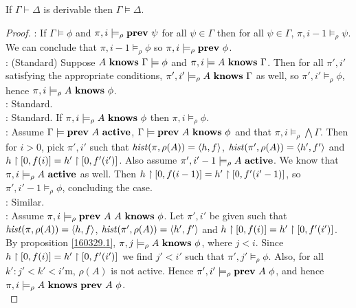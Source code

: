 \begin{theorem}
If $\Gamma \vdash \Delta$ is derivable then $\Gamma \models \Delta$.
\end{theorem}
\begin{proof} 

\noindent{}: If $\Gamma \models \phi$ and $\pi,i\models_\rho \mathbf{prev}\ \psi$ for all $\psi\in\Gamma$ then for all $\psi\in\Gamma$, $\pi,i-1\models_\rho \psi$. We can conclude that $\pi,i-1\models_\rho \phi$ so $\pi,i \models_\rho \Prev\ \phi$.\\

\noindent{}: (Standard) Suppose $A\ \mathbf{knows}\ \Gamma \models \phi$ and $\pi,i \models A\ \Knows\ \Gamma$. Then for all $\pi',i'$ satisfying the appropriate conditions,
$\pi',i'\models_\rho A\ \mathbf{knows}\ \Gamma$ as well, so $\pi',i'\models_\rho \phi$, hence $\pi,i\models_\rho A\ \Knows\ \phi$.\\

\noindent{}: Standard.\\

\noindent{}: Standard. If $\pi,i\models_\rho A\ \Knows\ \phi$ then $\pi,i\models_\rho \phi$.\\

\noindent{}: Assume $\Gamma \models \Prev\ A\ \Active$, $\Gamma\models \Prev\ A\ \Knows\ \phi$ and that $\pi,i\models_\rho \bigwedge\Gamma$. 
Then for  $i>0$, pick $\pi',i'$ such that
$\mathit{hist}(\pi,\rho(A)) = \langle h,f\rangle$, $\mathit{hist}(\pi',\rho(A)) = \langle h',f'\rangle$ and $h\upharpoonright [0,f(i)] = h'\upharpoonright[0,f'(i')]$. Also assume 
$\pi',i'-1\models_\rho A\ \mathbf{active}$. We know that $\pi,i\models_\rho A\ \mathbf{active}$ as well. Then $h\upharpoonright[0,f(i-1)] = h'\upharpoonright[0,f'(i'-1)]$, so $\pi',i'-1\models_\rho \phi$,
concluding the case.\\

\noindent{}: Similar.\\

\noindent{}: Assume $\pi,i  \models_\rho \Prev\ A\ A\ \Knows\ \phi$. Let $\pi',i'$ be given such that $\mathit{hist}(\pi,\rho(A)) = \langle h,f\rangle$, 
$\mathit{hist}(\pi',\rho(A)) = \langle h',f'\rangle$ and $h\upharpoonright [0,f(i)] = h'\upharpoonright[0,f'(i')]$. By proposition \ref{160329.1}, $\pi,j\models_\rho A\ \mathbf{knows}\ \phi$, where
$j<i$. Since $h\upharpoonright [0,f(i)] = h'\upharpoonright[0,f'(i')]$ we find $j'<i'$ such that $\pi',j' \models_\rho \phi$. Also, for all $k': j' < k' < i'$m, $\rho(A)$ is not active. Hence
$\pi',i'\models_\rho \mathbf{prev}\ A\ \phi$, and hence $\pi,i \models_\rho A\ \mathbf{knows}\ \mathbf{prev}\ A\ \phi$.\\


\end{proof}
